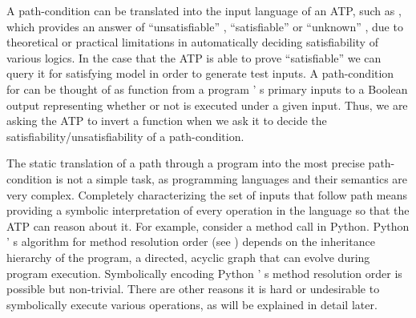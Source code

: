﻿\documentclass{IOS-Book-Article}
\begin{document}
\begin{mdP}[class={indent},data-line={105}]%
{}A path-condition can be translated into the input
language of an ATP, such as%
{}{\mdNbsp}%
{}%
{}, which provides an answer
of %
{}{\textquotedblleft}unsatisfiable{\textquotedblright}%
{}, %
{}{\textquotedblleft}satisfiable{\textquotedblright}%
{} or %
{}{\textquotedblleft}unknown{\textquotedblright}%
{}, due to theoretical or practical
limitations in automatically deciding satisfiability of various logics.
In the case that the ATP is able to prove %
{}{\textquotedblleft}satisfiable{\textquotedblright}%
{} we can query it for 
satisfying model in order to generate test inputs. A path-condition 
for %
{}%
{} can be thought of as function from a
program%
{}{'}%
{}s primary inputs to a Boolean output representing whether
or not %
{}%
{} is executed under a given input. Thus, we are asking
the ATP to invert a function when we ask it to decide
the satisfiability/unsatisfiability of a path-condition.%
\end{mdP}%
\begin{mdP}[class={indent},data-line={117}]%
{}The static translation of a path %
{}%
{} through a program %
{}%
{} into 
the most precise path-condition %
{}%
{} is not a simple task, as 
programming languages and their semantics are very complex.
Completely characterizing the set of inputs %
{}%
{} that follow
path %
{}%
{} means providing a symbolic interpretation of 
every operation in the language so that the
ATP can reason about it. For example, consider a method call in Python. 
Python%
{}{'}%
{}s algorithm for method resolution order (see%
{}{\mdNbsp}%
{})
depends on the inheritance hierarchy of the program, a directed, 
acyclic graph that can evolve during program execution. Symbolically
encoding Python%
{}{'}%
{}s method resolution order is possible but non-trivial.
There are other reasons it is hard or undesirable to symbolically 
execute various operations, as will be explained in detail later.%
\end{mdP}%
\end{document}
